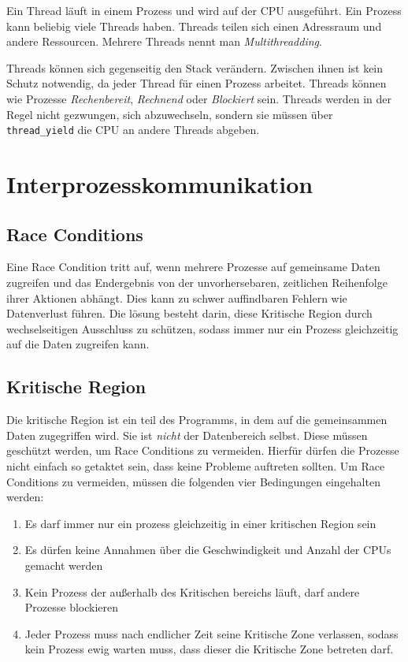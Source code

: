 Ein Thread läuft in einem Prozess und wird auf der CPU ausgeführt. Ein Prozess kann beliebig viele Threads haben. Threads teilen sich einen Adressraum und andere Ressourcen. Mehrere Threads nennt man \textit{Multithreadding}.

Threads können sich gegenseitig den Stack verändern. Zwischen ihnen ist kein Schutz notwendig, da jeder Thread für einen Prozess arbeitet. Threads können wie Prozesse \textit{Rechenbereit}, \textit{Rechnend} oder \textit{Blockiert} sein. Threads werden in der Regel nicht gezwungen, sich abzuwechseln, sondern sie müssen über \texttt{thread\_yield} die CPU an andere Threads abgeben.

\section{Interprozesskommunikation}

\subsection{Race Conditions}
\label{race_conditions}

Eine Race Condition  tritt auf, wenn mehrere Prozesse auf gemeinsame Daten zugreifen und das Endergebnis von der unvorhersebaren, zeitlichen Reihenfolge ihrer Aktionen abhängt. Dies kann zu schwer auffindbaren Fehlern wie Datenverlust führen. Die lösung besteht darin, diese Kritische Region durch wechselseitigen Ausschluss zu schützen, sodass immer nur ein Prozess gleichzeitig auf die Daten zugreifen kann.

\subsection{Kritische Region}

Die kritische Region ist ein teil des Programms, in dem auf die gemeinsammen Daten zugegriffen wird. Sie ist \textit{nicht} der Datenbereich selbst. Diese müssen geschützt werden, um Race Conditions zu vermeiden. Hierfür dürfen die Prozesse nicht einfach so getaktet sein, dass keine Probleme auftreten sollten. Um Race Conditions zu vermeiden, müssen die folgenden vier Bedingungen eingehalten werden:

\begin{enumerate}
    \item Es darf immer nur ein prozess  gleichzeitig in einer kritischen Region sein
    \item Es dürfen keine Annahmen über die Geschwindigkeit und Anzahl der CPUs gemacht werden
    \item Kein Prozess der außerhalb des Kritischen bereichs läuft, darf andere Prozesse blockieren
    \item Jeder Prozess muss nach endlicher Zeit seine Kritische Zone verlassen, sodass kein Prozess ewig warten muss, dass dieser die Kritische Zone betreten darf.
\end{enumerate}

